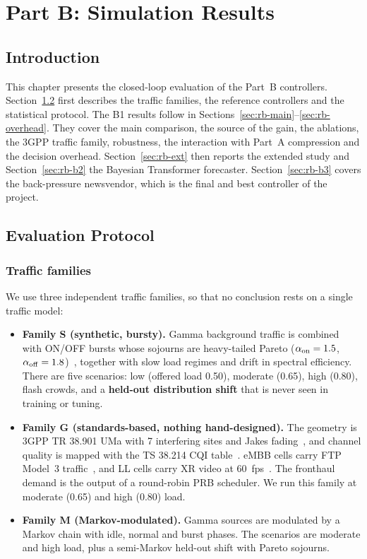 \chapter{Part B: Simulation Results}
\label{ch:partb-results}
\thispagestyle{plain}

\section{Introduction}

This chapter presents the closed-loop evaluation of the Part~B controllers. Section~\ref{sec:rb-protocol} first describes the traffic families, the reference controllers and the statistical protocol. The B1 results follow in Sections~\ref{sec:rb-main}--\ref{sec:rb-overhead}. They cover the main comparison, the source of the gain, the ablations, the 3GPP traffic family, robustness, the interaction with Part~A compression and the decision overhead. Section~\ref{sec:rb-ext} then reports the extended study and Section~\ref{sec:rb-b2} the Bayesian Transformer forecaster. Section~\ref{sec:rb-b3} covers the back-pressure newsvendor, which is the final and best controller of the project.

\section{Evaluation Protocol}
\label{sec:rb-protocol}

\subsection{Traffic families}

We use three independent traffic families, so that no conclusion rests on a single traffic model:
\begin{itemize}
  \item \textbf{Family S (synthetic, bursty).} Gamma background traffic is combined with ON/OFF bursts whose sojourns are heavy-tailed Pareto ($\alpha_{\rm on} = 1.5$, $\alpha_{\rm off} = 1.8$)~\cite{willinger1997}, together with slow load regimes and drift in spectral efficiency. There are five scenarios: low (offered load 0.50), moderate (0.65), high (0.80), flash crowds, and a \textbf{held-out distribution shift} that is never seen in training or tuning.
  \item \textbf{Family G (standards-based, nothing hand-designed).} The geometry is 3GPP TR 38.901 UMa with 7 interfering sites and Jakes fading~\cite{tr38901}, and channel quality is mapped with the TS 38.214 CQI table~\cite{ts38214}. eMBB cells carry FTP Model~3 traffic~\cite{tr36814}, and LL cells carry XR video at 60~fps~\cite{tr38838}. The fronthaul demand is the output of a round-robin PRB scheduler. We run this family at moderate (0.65) and high (0.80) load.
  \item \textbf{Family M (Markov-modulated).} Gamma sources are modulated by a Markov chain with idle, normal and burst phases. The scenarios are moderate and high load, plus a semi-Markov held-out shift with Pareto sojourns.
\end{itemize}

